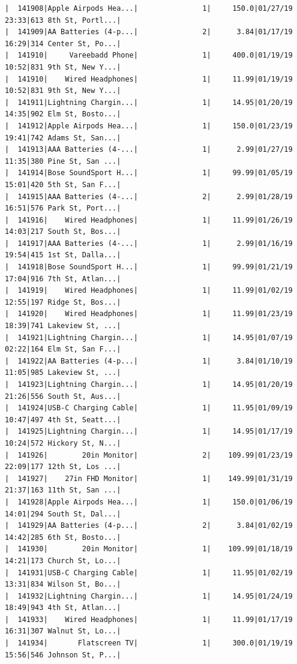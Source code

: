 \documentclass[
  letterpaper,
  DIV=11,
  numbers=noendperiod]{scrartcl}
\begin{document}
\begin{verbatim}
|  141908|Apple Airpods Hea...|               1|     150.0|01/27/19 23:33|613 8th St, Portl...|
|  141909|AA Batteries (4-p...|               2|      3.84|01/17/19 16:29|314 Center St, Po...|
|  141910|     Vareebadd Phone|               1|     400.0|01/19/19 10:52|831 9th St, New Y...|
|  141910|    Wired Headphones|               1|     11.99|01/19/19 10:52|831 9th St, New Y...|
|  141911|Lightning Chargin...|               1|     14.95|01/20/19 14:35|902 Elm St, Bosto...|
|  141912|Apple Airpods Hea...|               1|     150.0|01/23/19 19:41|742 Adams St, San...|
|  141913|AAA Batteries (4-...|               1|      2.99|01/27/19 11:35|380 Pine St, San ...|
|  141914|Bose SoundSport H...|               1|     99.99|01/05/19 15:01|420 5th St, San F...|
|  141915|AAA Batteries (4-...|               2|      2.99|01/28/19 16:51|576 Park St, Port...|
|  141916|    Wired Headphones|               1|     11.99|01/26/19 14:03|217 South St, Bos...|
|  141917|AAA Batteries (4-...|               1|      2.99|01/16/19 19:54|415 1st St, Dalla...|
|  141918|Bose SoundSport H...|               1|     99.99|01/21/19 17:04|916 7th St, Atlan...|
|  141919|    Wired Headphones|               1|     11.99|01/02/19 12:55|197 Ridge St, Bos...|
|  141920|    Wired Headphones|               1|     11.99|01/23/19 18:39|741 Lakeview St, ...|
|  141921|Lightning Chargin...|               1|     14.95|01/07/19 02:22|164 Elm St, San F...|
|  141922|AA Batteries (4-p...|               1|      3.84|01/10/19 11:05|985 Lakeview St, ...|
|  141923|Lightning Chargin...|               1|     14.95|01/20/19 21:26|556 South St, Aus...|
|  141924|USB-C Charging Cable|               1|     11.95|01/09/19 10:47|497 4th St, Seatt...|
|  141925|Lightning Chargin...|               1|     14.95|01/17/19 10:24|572 Hickory St, N...|
|  141926|        20in Monitor|               2|    109.99|01/23/19 22:09|177 12th St, Los ...|
|  141927|    27in FHD Monitor|               1|    149.99|01/31/19 21:37|163 11th St, San ...|
|  141928|Apple Airpods Hea...|               1|     150.0|01/06/19 14:01|294 South St, Dal...|
|  141929|AA Batteries (4-p...|               2|      3.84|01/02/19 14:42|285 6th St, Bosto...|
|  141930|        20in Monitor|               1|    109.99|01/18/19 14:21|173 Church St, Lo...|
|  141931|USB-C Charging Cable|               1|     11.95|01/02/19 13:31|834 Wilson St, Bo...|
|  141932|Lightning Chargin...|               1|     14.95|01/24/19 18:49|943 4th St, Atlan...|
|  141933|    Wired Headphones|               1|     11.99|01/17/19 16:31|307 Walnut St, Lo...|
|  141934|       Flatscreen TV|               1|     300.0|01/19/19 15:56|546 Johnson St, P...|

\end{verbatim}
\end{document}
